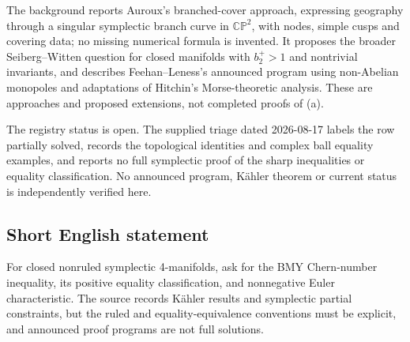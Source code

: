 \documentclass[11pt]{article}
\begin{document}
The background reports Auroux's branched-cover approach, expressing geography through a singular symplectic branch curve in \(\mathbb{CP}^2\), with nodes, simple cusps and covering data; no missing numerical formula is invented. It proposes the broader Seiberg--Witten question for closed manifolds with \(b_2^+>1\) and nontrivial invariants, and describes Feehan--Leness's announced program using non-Abelian monopoles and adaptations of Hitchin's Morse-theoretic analysis. These are approaches and proposed extensions, not completed proofs of (a).

The registry status is open. The supplied triage dated 2026-08-17 labels the row partially solved, records the topological identities and complex ball equality examples, and reports no full symplectic proof of the sharp inequalities or equality classification. No announced program, K\"ahler theorem or current status is independently verified here.
\subsection{Short English statement}
For closed nonruled symplectic 4-manifolds, ask for the BMY Chern-number inequality, its positive equality classification, and nonnegative Euler characteristic. The source records K\"ahler results and symplectic partial constraints, but the ruled and equality-equivalence conventions must be explicit, and announced proof programs are not full solutions.
\end{document}
